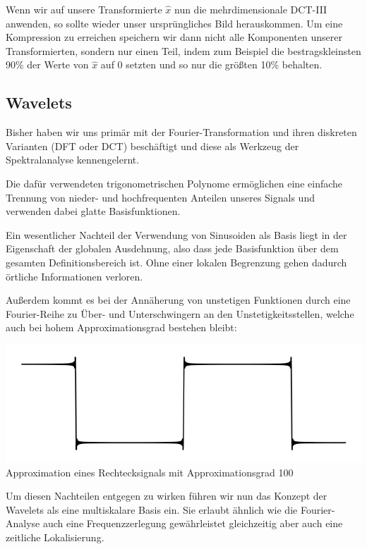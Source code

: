 Wenn wir auf unsere Transformierte $\hat{x}$ nun die mehrdimensionale DCT-III anwenden, so sollte wieder
unser ursprüngliches Bild herauskommen. Um eine Kompression zu erreichen speichern wir dann
nicht alle Komponenten unserer Transformierten, sondern nur einen Teil, indem zum Beispiel die
bestragskleinsten 90\% der Werte von $\hat{x}$ auf 0 setzten und so nur die größten 10\% behalten.

\subsection{Wavelets}
Bisher haben wir uns primär mit der Fourier-Transformation und ihren diskreten Varianten (DFT oder DCT) beschäftigt 
und diese als Werkzeug der Spektralanalyse kennengelernt. 

Die dafür verwendeten trigonometrischen Polynome ermöglichen eine einfache Trennung von nieder- und hochfrequenten 
Anteilen unseres Signals und verwenden dabei glatte Basisfunktionen. 

Ein wesentlicher Nachteil der Verwendung von Sinusoiden als Basis liegt in der Eigenschaft der globalen Ausdehnung, 
also dass jede Basisfunktion über dem gesamten Definitionsbereich \grqq{} ist. Ohne einer 
lokalen Begrenzung gehen dadurch örtliche Informationen verloren. 

Außerdem kommt es bei der Annäherung von unstetigen Funktionen durch eine Fourier-Reihe zu
Über- und Unterschwingern an den Unstetigkeitsstellen, welche auch bei hohem Approximationsgrad
bestehen bleibt: \\

\begin{center}
  \includegraphics{figures/gibbsSquareWave100.png} \\
  \small Approximation eines Rechtecksignals mit Approximationsgrad 100
\end{center}

Um diesen Nachteilen entgegen zu wirken führen wir nun das Konzept der Wavelets als eine multiskalare Basis ein. 
Sie erlaubt ähnlich wie die Fourier-Analyse auch eine Frequenzzerlegung gewährleistet gleichzeitig aber auch eine 
zeitliche Lokalisierung. 

